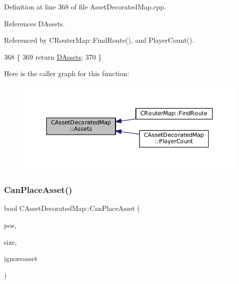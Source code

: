 Definition at line 368 of file Asset\+Decorated\+Map.\+cpp.



References D\+Assets.



Referenced by C\+Router\+Map\+::\+Find\+Route(), and Player\+Count().


\begin{DoxyCode}
368                                                                                 \{
369     \textcolor{keywordflow}{return} \hyperlink{classCAssetDecoratedMap_a94eeed5b16141169b1ba6cb3842055aa}{DAssets};
370 \}
\end{DoxyCode}
Here is the caller graph for this function\+:\nopagebreak
\begin{figure}[H]
\begin{center}
\leavevmode
\includegraphics[width=350pt]{classCAssetDecoratedMap_a2f4d2597697593197567877900d55c52_icgraph}
\end{center}
\end{figure}
\hypertarget{classCAssetDecoratedMap_ad4baef4b84b066847459e45205c8575c}{}\label{classCAssetDecoratedMap_ad4baef4b84b066847459e45205c8575c} 
\subsubsection{\texorpdfstring{Can\+Place\+Asset()}{CanPlaceAsset()}}
{\footnotesize\ttfamily bool C\+Asset\+Decorated\+Map\+::\+Can\+Place\+Asset (\begin{DoxyParamCaption}\item[{const \hyperlink{classCPosition}{C\+Position} \&}]{pos,  }\item[{int}]{size,  }\item[{std\+::shared\+\_\+ptr$<$ \hyperlink{classCPlayerAsset}{C\+Player\+Asset} $>$}]{ignoreasset }\end{DoxyParamCaption})}




